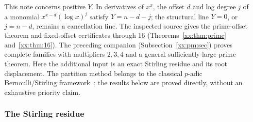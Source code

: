 \documentclass[11pt,a4paper]{article}
\numberwithin{equation}{section}
\theoremstyle{definition}
\theoremstyle{remark}
\theoremstyle{plain}
\begin{document}
This note concerns positive $Y$. In derivatives of $x^x$, the offset $d$ and
log degree $j$ of a monomial $x^{x-d}(\log x)^j$ satisfy $Y=n-d-j$; the
structural line $Y=0$, or $j=n-d$, remains a cancellation line. The inspected
source gives the prime-offset theorem and fixed-offset certificates through
$16$ (Theorems~\ref{xx:thm:prime} and~\ref{xx:thm:16}). The preceding companion
(Subsection~\ref{xx:pm:sec}) proves complete families with multipliers $2,3,4$
and a general sufficiently-large-prime theorem. Here the additional input is an
exact Stirling residue and its root displacement. The partition method belongs
to the classical $p$-adic Bernoulli/Stirling
framework~\cite{xx-davis,xx-adelberg}; the results below are proved directly,
without an exhaustive priority claim.

\subsubsection{The Stirling residue}
\end{document}
